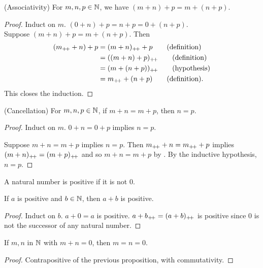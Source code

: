 \begin{exercise}
    (Associativity) For $m, n, p \in \mathbb{N}$, we have $(m + n) + p = m + (n + p)$.
\end{exercise}
\begin{proof}
    Induct on $m$.
    $(0 + n) + p = n + p = 0 + (n + p)$. \\
    Suppose $(m + n) + p = m + (n + p)$.
    Then \begin{align*}
        (m_{+\!+} + n) + p &= (m + n)_{+\!+} + p \tag{definition} \\
                       &= ((m + n) + p)_{+\!+} \tag{definition} \\
                       &= (m + (n + p))_{+\!+} \tag{hypothesis} \\
                       &= m_{+\!+} + (n + p) \tag{definition}.
    \end{align*}
    This closes the induction.
\end{proof}

\begin{exercise}
    (Cancellation) For $m, n, p \in \mathbb{N}$, if $m + n = m + p$, then $n = p$.
\end{exercise}
\begin{proof}
    Induct on $m$.
    $0 + n = 0 + p$ implies $n = p$.

    Suppose $m + n = m + p$ implies $n = p$.
    Then $m_{+\!+} + n = m_{+\!+} + p$ implies $(m + n)_{+\!+} = (m + p)_{+\!+}$ and so
    $m + n = m + p$ by .
    By the inductive hypothesis, $n = p$.
\end{proof}

\begin{definition*}[Positive] \label{def:positive}
    A natural number is positive if it is not $0$.
\end{definition*}

\begin{proposition}
    If $a$ is positive and $b \in \mathbb{N}$, then $a + b$ is positive.
\end{proposition}
\begin{proof}
    Induct on $b$.
    $a + 0 = a$ is positive.
    $a + b_{+\!+} = (a + b)_{+\!+}$ is positive since $0$ is not the successor of any
    natural number.
\end{proof}

\begin{exercise}
    If $m, n$ in $\mathbb{N}$ with $m + n = 0$, then $m = n = 0$.
\end{exercise}
\begin{proof}
    Contrapositive of the previous proposition, with commutativity.
\end{proof}

